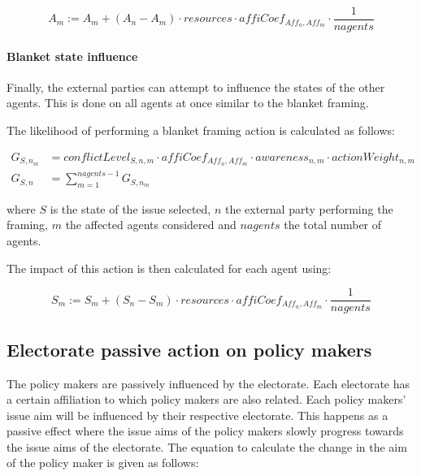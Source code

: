 \begin{equation}\label{eq:impactBlanketFraming}
A_{m} := A_{m} + \left( A_{n} - A_{m} \right) \cdot resources \cdot affiCoef_{Aff_n,Aff_m} \cdot \frac{1}{nagents}
\end{equation}

\paragraph{Blanket state influence}

Finally, the external parties can attempt to influence the states of the other agents. This is done on all agents at once similar to the blanket framing.

The likelihood of performing a blanket framing action is calculated as follows:

\begin{equation}\label{eq:likelihoodBlanketFraming}\begin{split}
G_{S, n_m} &= conflictLevel_{S, n, m} \cdot affiCoef_{Aff_n,Aff_m} \cdot awareness_{n,m} \cdot actionWeight_{n,m}\\
G_{S, n} &= \sum_{m = 1}^{nagents-1} G_{S, n_m}
\end{split}\end{equation}

where $S$ is the state of the issue selected, $n$ the external party performing the framing, $m$ the affected agents considered and $nagents$ the total number of agents.

The impact of this action is then calculated for each agent using:

\begin{equation}\label{eq:impactBlanketFraming}
S_{m} := S_{m} + \left( S_{n} - S_{m} \right) \cdot resources \cdot affiCoef_{Aff_n,Aff_m} \cdot \frac{1}{nagents}
\end{equation}



\subsection{Electorate passive action on policy makers}

The policy makers are passively influenced by the electorate. Each electorate has a certain affiliation to which policy makers are also related. Each policy makers' issue aim will be influenced by their respective electorate. This happens as a passive effect where the issue aims of the policy makers slowly progress towards the issue aims of the electorate. The equation to calculate the change in the aim of the policy maker is given as follows:

